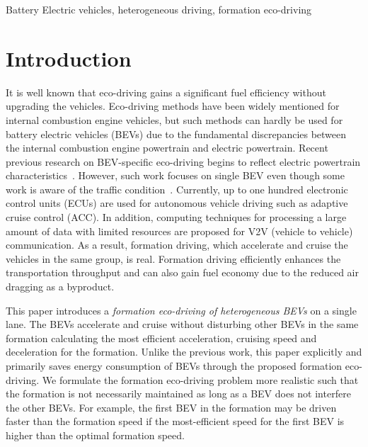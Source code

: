 \documentclass{IEEEtran}
\begin{document}
\begin{IEEEkeywords}
Battery Electric vehicles, heterogeneous driving, formation eco-driving
\end{IEEEkeywords}



\section{Introduction}

It is well known that eco-driving gains a significant fuel efficiency without upgrading the vehicles.
Eco-driving methods have been widely mentioned for internal combustion engine vehicles, but such methods can hardly be used for battery electric vehicles (BEVs) due to the fundamental discrepancies between the internal combustion engine powertrain and electric powertrain.
Recent previous research on BEV-specific eco-driving begins to reflect electric powertrain characteristics~\cite{Lin:ICCA14, Wu:ITS15, Dib:IVPPC11}. However, such work focuses on single BEV even though some work is aware of the traffic condition~\cite{Dib:CEP14, Wu:ITS15}. 
Currently, up to one hundred electronic control units (ECUs) are used for autonomous vehicle driving such as adaptive cruise control (ACC). In addition, computing techniques for processing a large amount of data with limited resources are proposed for V2V (vehicle to vehicle) communication. As a result, formation driving, which accelerate and cruise the vehicles in the same group, is real. Formation driving efficiently enhances the transportation throughput and can also gain fuel economy due to the reduced air dragging as a byproduct.

This paper introduces a \textit{formation eco-driving of heterogeneous BEVs} on a single lane. The BEVs accelerate and cruise without disturbing other BEVs in the same formation calculating the most efficient acceleration, cruising speed and deceleration for the formation. Unlike the previous work, this paper explicitly and primarily saves energy consumption of BEVs through the proposed formation eco-driving. 
We formulate the formation eco-driving problem more realistic such that the formation is not necessarily maintained as long as a BEV does not interfere the other BEVs. For example, the first BEV in the formation may be driven faster than the formation speed if the most-efficient speed for the first BEV is higher than the optimal formation speed. 
\end{document}
